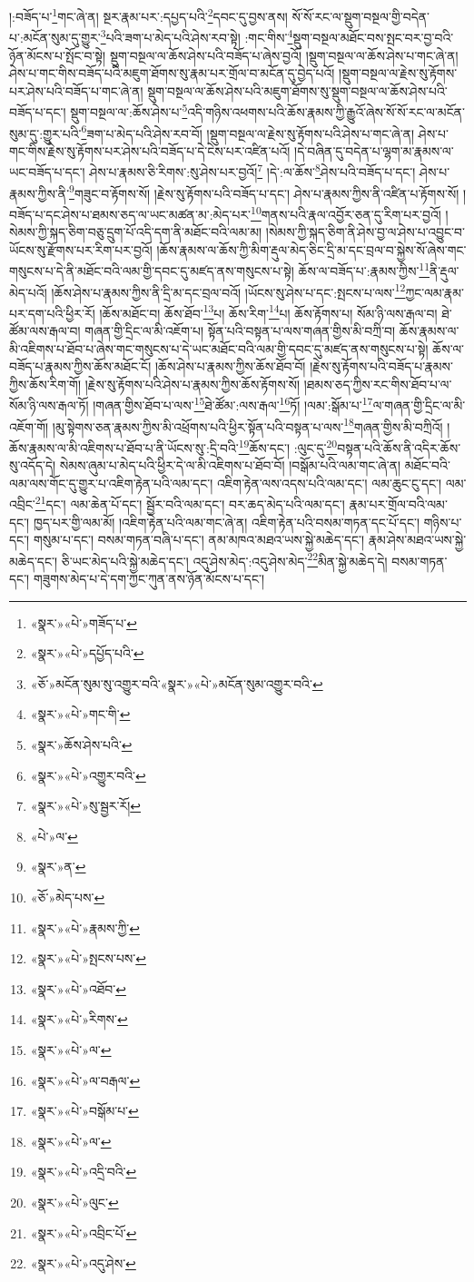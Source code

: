 །:བཟོད་པ་\footnote{«སྣར་»«པེ་»གཟོད་པ་}གང་ཞེ་ན། སྔར་རྣམ་པར་:དཔྱད་པའི་\footnote{«སྣར་»«པེ་»དཔྱོད་པའི་}དབང་དུ་བྱས་ནས། སོ་སོ་རང་ལ་སྡུག་བསྔལ་གྱི་བདེན་པ་:མངོན་སུམ་དུ་གྱུར་\footnote{«ཅོ་»མངོན་སུམ་སུ་འགྱུར་བའི་«སྣར་»«པེ་»མངོན་སུམ་འགྱུར་བའི་}པའི་ཟག་པ་མེད་པའི་ཤེས་རབ་སྟེ། :གང་གིས་\footnote{«སྣར་»«པེ་»གང་གི་}སྡུག་བསྔལ་མཐོང་བས་སྤང་བར་བྱ་བའི་ཉོན་མོངས་པ་སྤོང་བ་སྟེ། སྡུག་བསྔལ་ལ་ཆོས་ཤེས་པའི་བཟོད་པ་ཞེས་བྱའོ། །སྡུག་བསྔལ་ལ་ཆོས་ཤེས་པ་གང་ཞེ་ན། ཤེས་པ་གང་གིས་བཟོད་པའི་མཇུག་ཐོགས་སུ་རྣམ་པར་གྲོལ་བ་མངོན་དུ་བྱེད་པའོ། །སྡུག་བསྔལ་ལ་རྗེས་སུ་རྟོགས་པར་ཤེས་པའི་བཟོད་པ་གང་ཞེ་ན། སྡུག་བསྔལ་ལ་ཆོས་ཤེས་པའི་མཇུག་ཐོགས་སུ་སྡུག་བསྔལ་ལ་ཆོས་ཤེས་པའི་བཟོད་པ་དང་། སྡུག་བསྔལ་ལ་:ཆོས་ཤེས་པ་\footnote{«སྣར་»ཆོས་ཤེས་པའི་}འདི་གཉིས་འཕགས་པའི་ཆོས་རྣམས་ཀྱི་རྒྱུའོ་ཞེས་སོ་སོ་རང་ལ་མངོན་སུམ་དུ་:གྱུར་པའི་\footnote{«སྣར་»«པེ་»འགྱུར་བའི་}ཟག་པ་མེད་པའི་ཤེས་རབ་བོ། །སྡུག་བསྔལ་ལ་རྗེས་སུ་རྟོགས་པའི་ཤེས་པ་གང་ཞེ་ན། ཤེས་པ་གང་གིས་རྗེས་སུ་རྟོགས་པར་ཤེས་པའི་བཟོད་པ་དེ་ངེས་པར་འཛིན་པའོ། །དེ་བཞིན་དུ་བདེན་པ་ལྷག་མ་རྣམས་ལ་ཡང་བཟོད་པ་དང་། ཤེས་པ་རྣམས་ཅི་རིགས་:སུ་ཤེས་པར་བྱའོ།\footnote{«སྣར་»«པེ་»སུ་སྦྱར་རོ།} །དེ་:ལ་ཆོས་\footnote{«པེ་»ལ་}ཤེས་པའི་བཟོད་པ་དང་། ཤེས་པ་རྣམས་ཀྱིས་ནི་\footnote{«སྣར་»ན་}གཟུང་བ་རྟོགས་སོ། །རྗེས་སུ་རྟོགས་པའི་བཟོད་པ་དང་། ཤེས་པ་རྣམས་ཀྱིས་ནི་འཛིན་པ་རྟོགས་སོ། །བཟོད་པ་དང་ཤེས་པ་ཐམས་ཅད་ལ་ཡང་མཚན་མ་:མེད་པར་\footnote{«ཅོ་»མེད་པས་}གནས་པའི་རྣལ་འབྱོར་ཅན་དུ་རིག་པར་བྱའོ། །སེམས་ཀྱི་སྐད་ཅིག་བཅུ་དྲུག་པོ་འདི་དག་ནི་མཐོང་བའི་ལམ་མ། །སེམས་ཀྱི་སྐད་ཅིག་ནི་ཤེས་བྱ་ལ་ཤེས་པ་འབྱུང་བ་ཡོངས་སུ་རྫོགས་པར་རིག་པར་བྱའོ། །ཆོས་རྣམས་ལ་ཆོས་ཀྱི་མིག་རྡུལ་མེད་ཅིང་དྲི་མ་དང་བྲལ་བ་སྐྱེས་སོ་ཞེས་གང་གསུངས་པ་དེ་ནི་མཐོང་བའི་ལམ་གྱི་དབང་དུ་མཛད་ནས་གསུངས་པ་སྟེ། ཆོས་ལ་བཟོད་པ་:རྣམས་ཀྱིས་\footnote{«སྣར་»«པེ་»རྣམས་ཀྱི་}ནི་རྡུལ་མེད་པའོ། །ཆོས་ཤེས་པ་རྣམས་ཀྱིས་ནི་དྲི་མ་དང་བྲལ་བའོ། །ཡོངས་སུ་ཤེས་པ་དང་:སྤངས་པ་ལས་\footnote{«སྣར་»«པེ་»སྤངས་པས་}ཀྱང་ལམ་རྣམ་པར་དག་པའི་ཕྱིར་རོ། །ཆོས་མཐོང་བ། ཆོས་ཐོབ་\footnote{«སྣར་»«པེ་»འཐོབ་}པ། ཆོས་རིག་\footnote{«སྣར་»«པེ་»རིགས་}པ། ཆོས་རྟོགས་པ། སོམ་ཉི་ལས་རྒལ་བ། ཐེ་ཚོམ་ལས་རྒལ་བ། གཞན་གྱི་དྲིང་ལ་མི་འཇོག་པ། སྟོན་པའི་བསྟན་པ་ལས་གཞན་གྱིས་མི་བཀྲི་བ། ཆོས་རྣམས་ལ་མི་འཇིགས་པ་ཐོབ་པ་ཞེས་གང་གསུངས་པ་དེ་ཡང་མཐོང་བའི་ལམ་གྱི་དབང་དུ་མཛད་ནས་གསུངས་པ་སྟེ། ཆོས་ལ་བཟོད་པ་རྣམས་ཀྱིས་ཆོས་མཐོང་ངོ། །ཆོས་ཤེས་པ་རྣམས་ཀྱིས་ཆོས་ཐོབ་བོ། །རྗེས་སུ་རྟོགས་པའི་བཟོད་པ་རྣམས་ཀྱིས་ཆོས་རིག་གོ། །རྗེས་སུ་རྟོགས་པའི་ཤེས་པ་རྣམས་ཀྱིས་ཆོས་རྟོགས་སོ། །ཐམས་ཅད་ཀྱིས་རང་གིས་ཐོབ་པ་ལ་སོམ་ཉི་ལས་རྒལ་ཏོ། །གཞན་གྱིས་ཐོབ་པ་ལས་\footnote{«སྣར་»«པེ་»ལ་}ཐེ་ཚོམ་:ལས་རྒལ་\footnote{«སྣར་»«པེ་»ལ་བརྒལ་}ཏོ། །ལམ་:སྒོམ་པ་\footnote{«སྣར་»«པེ་»བསྒོམ་པ་}ལ་གཞན་གྱི་དྲིང་ལ་མི་འཇོག་གོ། །མུ་སྟེགས་ཅན་རྣམས་ཀྱིས་མི་འཕྲོགས་པའི་ཕྱིར་སྟོན་པའི་བསྟན་པ་ལས་\footnote{«སྣར་»«པེ་»ལ་}གཞན་གྱིས་མི་བཀྲིའོ། །ཆོས་རྣམས་ལ་མི་འཇིགས་པ་ཐོབ་པ་ནི་ཡོངས་སུ་:དྲི་བའི་\footnote{«སྣར་»«པེ་»འདྲི་བའི་}ཆོས་དང་། :ལུང་དུ་\footnote{«སྣར་»«པེ་»ལུང་}བསྟན་པའི་ཆོས་ནི་འདིར་ཆོས་སུ་འདོད་དེ། སེམས་ཞུམ་པ་མེད་པའི་ཕྱིར་དེ་ལ་མི་འཇིགས་པ་ཐོབ་བོ། །བསྒོམ་པའི་ལམ་གང་ཞེ་ན། མཐོང་བའི་ལམ་ལས་གོང་དུ་གྱུར་པ་འཇིག་རྟེན་པའི་ལམ་དང་། འཇིག་རྟེན་ལས་འདས་པའི་ལམ་དང་། ལམ་ཆུང་ངུ་དང་། ལམ་འབྲིང་\footnote{«སྣར་»«པེ་»འབྲིང་པོ་}དང་། ལམ་ཆེན་པོ་དང་། སྦྱོར་བའི་ལམ་དང་། བར་ཆད་མེད་པའི་ལམ་དང་། རྣམ་པར་གྲོལ་བའི་ལམ་དང་། ཁྱད་པར་གྱི་ལམ་མོ། །འཇིག་རྟེན་པའི་ལམ་གང་ཞེ་ན། འཇིག་རྟེན་པའི་བསམ་གཏན་དང་པོ་དང་། གཉིས་པ་དང་། གསུམ་པ་དང་། བསམ་གཏན་བཞི་པ་དང་། ནམ་མཁའ་མཐའ་ཡས་སྐྱེ་མཆེད་དང་། རྣམ་ཤེས་མཐའ་ཡས་སྐྱེ་མཆེད་དང་། ཅི་ཡང་མེད་པའི་སྐྱེ་མཆེད་དང་། འདུ་ཤེས་མེད་:འདུ་ཤེས་མེད་\footnote{«སྣར་»«པེ་»འདུ་ཤེས་}མིན་སྐྱེ་མཆེད་དེ། བསམ་གཏན་དང་། གཟུགས་མེད་པ་དེ་དག་ཀྱང་ཀུན་ནས་ཉོན་མོངས་པ་དང་། 